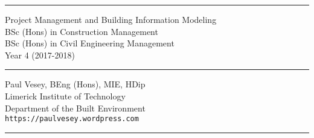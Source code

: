 
\thispagestyle{empty} %


\hrule

\vspace*{0.7cm} %


\begin{flushright}
\Huge Project Management and Building Information Modeling \\
\vspace*{0.7cm}
\Large BSc (Hons) in Construction Management\\
BSc (Hons) in Civil Engineering Management\\
Year 4 (2017-2018)
\end{flushright}

\vspace*{0.7cm} %
	
\normalsize

\hrule


\vfill %


{\centering \large 
\hfill Paul Vesey, \scriptsize BEng (Hons), MIE, HDip\normalsize \\
\hfill Limerick Institute of Technology \\
\hfill Department of the Built Environment \\
\hfill \texttt{https://paulvesey.wordpress.com} \\
\vspace*{0.7cm} 
\hrule} %


\clearpage %
